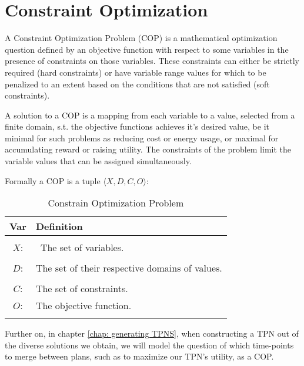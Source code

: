 \section{Constraint Optimization}
\label{background: COP}
A Constraint Optimization Problem (COP) is a mathematical optimization question defined by an objective function with respect to some variables in the presence of constraints on those variables. 
These constraints can either be strictly required (hard constraints) or have variable range values for which to be penalized to an extent based on the conditions that are not satisfied (soft constraints).

A solution to a COP is a mapping from each variable to a value, selected from a finite domain, s.t. the objective functions achieves it's desired value, be it minimal for such problems as reducing cost or energy usage, or maximal for accumulating reward or raising utility.
The constraints of the problem limit the variable values that can be assigned simultaneously.

Formally a COP is a tuple $\langle X,D,C,O\rangle$: 
\begin{table}[ht!]
\centering
\begin{tabularx}{\textwidth}{ c  X }

\textbf{Var}  & \textbf{Definition} \\
\hline
\\
$X$:     & \ {The set of variables.}  \\
\\
$D$:     & {The set of their respective domains of values. }       \\
\\
$C$:     & {The set of constraints.}      \\
$O$:     & {The objective function.}      \\
\\

\end{tabularx}
\caption{Constrain Optimization Problem}
\label{tab:COP}
\end{table}


Further on, in chapter \ref{chap: generating TPNS},  when constructing a TPN out of the diverse solutions we obtain, we will model the question of which time-points to merge between plans, such as to maximize our TPN's utility, as a COP.

